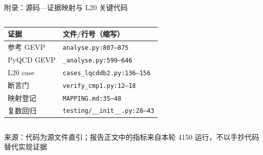 \documentclass[UTF8,aspectratio=169,11pt]{ctexbeamer}
\newcommand{\source}[1]{\vspace{0.05em}\par{\raggedright\scriptsize\color{muted}来源：#1\par}}
\begin{document}
\appendix

\begin{frame}[t]{附录：源码—证据映射与 L20 关键代码}
  \begin{columns}[T,totalwidth=\textwidth]
    \begin{column}{0.48\textwidth}
      \scriptsize
      \setlength{\tabcolsep}{2pt}
      \renewcommand{\arraystretch}{0.90}
      \begin{tabularx}{\linewidth}{@{}lY@{}}
        \toprule
        证据 & 文件/行号（缩写）\\
        \midrule
        参考 GEVP & \texttt{analyse.py:807--875}\\
        PyQCD GEVP & \texttt{\_analyse.py:599--646}\\
        L20 case & \texttt{cases\_lqcddb2.py:136--156}\\
        断言门 & \texttt{verify\_cmp1.py:12--18}\\
        映射登记 & \texttt{MAPPING.md:35--48}\\
        复数回归 & \texttt{testing/\_\_init\_\_.py:28--43}\\
        \bottomrule
      \end{tabularx}
    \end{column}
    \begin{column}{0.49\textwidth}
      
    \end{column}
  \end{columns}
  \source{代码为源文件直引；报告正文中的指标来自本轮 4150 运行，不以手抄代码替代实现证据}
\end{frame}
\end{document}
